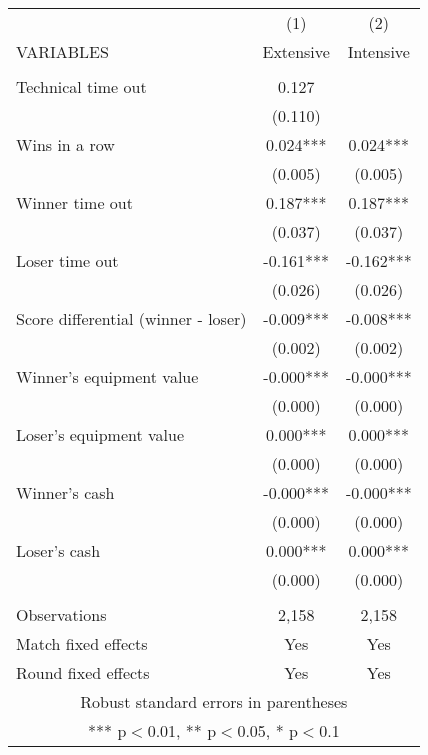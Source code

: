 \documentclass[]{article}
\begin{document}
\begin{tabular}{lcc} \hline
 & (1) & (2) \\
VARIABLES & Extensive & Intensive \\ \hline
 &  &  \\
Technical time out & 0.127 &  \\
 & (0.110) &  \\
Wins in a row & 0.024*** & 0.024*** \\
 & (0.005) & (0.005) \\
Winner time out & 0.187*** & 0.187*** \\
 & (0.037) & (0.037) \\
Loser time out & -0.161*** & -0.162*** \\
 & (0.026) & (0.026) \\
Score differential (winner - loser) & -0.009*** & -0.008*** \\
 & (0.002) & (0.002) \\
Winner's equipment value & -0.000*** & -0.000*** \\
 & (0.000) & (0.000) \\
Loser's equipment value & 0.000*** & 0.000*** \\
 & (0.000) & (0.000) \\
Winner's cash & -0.000*** & -0.000*** \\
 & (0.000) & (0.000) \\
Loser's cash & 0.000*** & 0.000*** \\
 & (0.000) & (0.000) \\
 &  &  \\
Observations & 2,158 & 2,158 \\
Match fixed effects & Yes & Yes \\
 Round fixed effects & Yes & Yes \\ \hline
\multicolumn{3}{c}{ Robust standard errors in parentheses} \\
\multicolumn{3}{c}{ *** p$<$0.01, ** p$<$0.05, * p$<$0.1} \\
\end{tabular}
\end{document}
